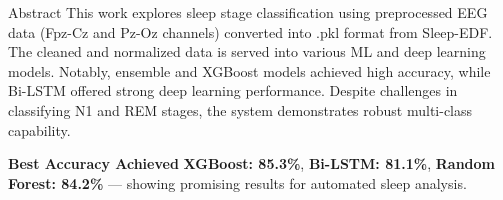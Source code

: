 \begin{frame}{Abstract}
	This work explores sleep stage classification using preprocessed EEG data (Fpz-Cz and Pz-Oz channels) converted into .pkl format from Sleep-EDF. The cleaned and normalized data is served into various ML and deep learning models. Notably, ensemble and XGBoost models achieved high accuracy, while Bi-LSTM offered strong deep learning performance. Despite challenges in classifying N1 and REM stages, the system demonstrates robust multi-class capability.
	\begin{block}{\textbf{Best Accuracy Achieved}}
		\textbf{XGBoost: 85.3\%}, \textbf{Bi-LSTM: 81.1\%}, \textbf{Random Forest: 84.2\%} — showing promising results for automated sleep analysis.
	\end{block}
\end{frame}